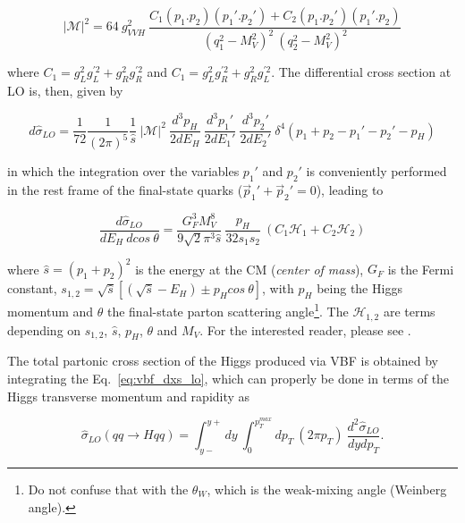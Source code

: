\begin{equation}
|\mathcal{M}|^{2} = 64~g_{VVH}^{2}~\frac{C_{1}(p_{1}.p_{2})(p_{1}'.p_{2}') + C_{2}(p_{1}.p_{2}')(p_{1}'.p_{2})}{(q_{1}^{2}-M_{V}^{2})^{2}~(q_{2}^{2}-M_{V}^{2})^{2}}
\end{equation}

where $C_{1} = g_{L}^{2}g_{L}^{'2} + g_{R}^{2}g_{R}^{'2}$ and $C_{1} = g_{L}^{2}g_{R}^{'2} + g_{R}^{2}g_{L}^{'2}$. The differential cross section at LO is, then, given by \cite{bib:PhysRep457-1-2005}

\begin{equation}
d\hat{\sigma}_{LO} = \frac{1}{72}\frac{1}{(2\pi)^{5}}\frac{1}{\hat{s}}~|\mathcal{M}|^{2}~\frac{d^{3}p_{H}}{2dE_{H}}~\frac{d^{3}p_{1}'}{2dE_{1}'}~\frac{d^{3}p_{2}'}{2dE_{2}'}~\delta^{4}(p_{1}+p_{2}-p_{1}'-p_{2}'-p_{H})
\end{equation}

in which the integration over the variables $p_{1}'$ and $p_{2}'$ is conveniently performed in the rest frame of the final-state quarks ($\vec{p}_{1}' + \vec{p}_{2}' = 0$), leading to \cite{bib:PhysRep457-1-2005}

\begin{equation}
\frac{d\hat{\sigma}_{LO}}{dE_{H}~dcos~\theta} = \frac{G_{F}^{3}M_{V}^{8}}{9\sqrt{2}\pi^{3}\hat{s}}~\frac{p_{H}}{32s_{1}s_{2}}~(C_{1}\mathcal{H}_{1} + C_{2}\mathcal{H}_{2})
\label{eq:vbf_dxs_lo}
\end{equation}

where $\hat{s} = (p_{1}+p_{2})^{2}$ is the energy at the CM (\textit{center of mass}), $G_{F}$ is the Fermi constant, $s_{1,2} = \sqrt{\hat{s}}[(\sqrt{\hat{s}}-E_{H}) \pm p_{H}cos~\theta]$, with $p_{H}$ being the Higgs momentum and $\theta$ the final-state parton scattering angle\footnote{Do not confuse that with the $\theta_{W}$, which is the weak-mixing angle (Weinberg angle).}. The $\mathcal{H}_{1,2}$ are terms depending on $s_{1,2}$, $\hat{s}$, $p_{H}$, $\theta$ and $M_{V}$. For the interested reader, please see \cite{bib:PhysRep457-1-2005}.

The total partonic cross section of the Higgs produced via VBF is obtained by integrating the Eq.~\ref{eq:vbf_dxs_lo}, which can properly be done in terms of the Higgs transverse momentum and rapidity as

\begin{equation}
\hat{\sigma}_{LO}(qq \rightarrow Hqq) = \int_{y-}^{y+}dy~\int_{0}^{p_{T}^{max}}dp_{T}~(2\pi p_{T})~\frac{d^{2}\hat{\sigma}_{LO}}{dydp_{T}}.
\label{eq:vbf_xs_lo}
\end{equation}

